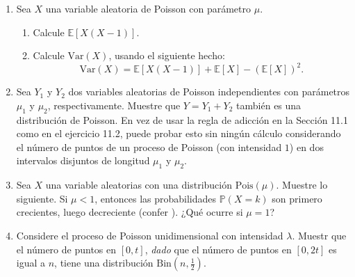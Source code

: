 \begin{enumerate}
         \centering
         \begin{tabular}{c|cccccccccc}
           $j$ 	& $0$ & $1$ & $2$ & $3$ & $4$ & $5$ & $6$ & $7$ & $8$ & $9$ \\
           \hline
           $f(x)$& $19$ & $38$ & $28$ & $20$ & $7$ & $3$ & $4$ & $0$ & $0$ & $1$
         \end{tabular}\quad.
         Note que el número total de autos que pasan en esos $20$ minutos es $230$.
         \begin{enumerate}
         \item ¿Qué elegirías para el parámetro de intensidad $\lambda$?\label{12.7a}
         \item Suponga que estima la propabilidad de que cero autos pasando en una ranura de tiempo de \SI{10}{\second} por $n_0$ dividido por el número total de ranuras de tiempo. ¿Eso está de acuerdo (razonablemente) con el valor que sigue desde su respuesta en?~\ref{12.7a}? %
         \item  ¿Qué tomarías para la probabilidad que $10$ autos pasan en una ranura de tiempo de \SI{10}{\second}?
         \end{enumerate}
       \item Sea $X$ una variable aleatoria de Poisson con parámetro $\mu$.
         \begin{enumerate}
         \item Calcule $\mathds{E}\left[X\left(X-1\right)\right]$.
         \item Calcule $\mathrm{Var}\left(X\right)$, usando el siguiente hecho:
           \begin{equation*}
             \mathrm{Var}\left(X\right)=\mathds{E}\left[X\left(X-1\right)\right]+\mathds{E}\left[X\right]-{\left(\mathds{E}\left[X\right]\right)}^2.
           \end{equation*}
         \end{enumerate}
       \item Sea $Y_1$ y $Y_2$ dos variables aleatorias de Poisson independientes con parámetros $\mu_1$ y $\mu_2$, respectivamente. Muestre que $Y=Y_1+Y_2$ también es una distribución de Poisson. En vez de usar la regla de adicción en la Sección 11.1 como en el ejercicio 11.2, puede probar esto sin ningún cálculo considerando el número de puntos de un proceso de Poisson (con intensidad $1$) en dos intervalos disjuntos de longitud $\mu_1$ y $\mu_2$.
       \item Sea $X$ una variable aleatorias con una distribución $\mathrm{Pois}\left(\mu\right)$. Muestre lo siguiente. Si $\mu<1$, entonces las probabilidades $\mathds{P}\left(X=k\right)$ son primero crecientes, luego decreciente (confer ). ¿Qué ocurre si $\mu=1$? %
       \item Considere el proceso de Poisson unidimensional con intensidad $\lambda$. Muestr que el número de puntos en $\left[0,t\right]$, \emph{dado} que el número de puntos en $\left[0,2t\right]$ es igual a $n$, tiene una distribución $\mathrm{Bin}\left(n,\tfrac{1}{2}\right)$.


\end{enumerate}
